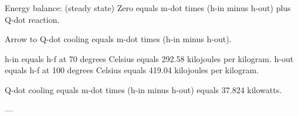 Energy balance: (steady state)  
Zero equals m-dot times (h-in minus h-out) plus Q-dot reaction.  

Arrow to Q-dot cooling equals m-dot times (h-in minus h-out).  

h-in equals h-f at 70 degrees Celsius equals 292.58 kilojoules per kilogram.  
h-out equals h-f at 100 degrees Celsius equals 419.04 kilojoules per kilogram.  

Q-dot cooling equals m-dot times (h-in minus h-out) equals 37.824 kilowatts.  

---
